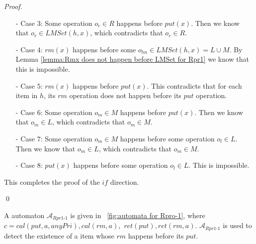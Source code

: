 \documentclass{llncs}
\begin{document}
\begin {proof}
\begin{itemize}
\item[-] Case $3$: Some operation $o_r \in R$ happens before $\textit{put}(x)$. Then we know that $o_r \in \textit{LMSet}(h,x)$, which contradicts that $o_r \in R$.

\item[-] Case $4$: $\textit{rm}(x)$ happens before some $o_{lm} \in \textit{LMSet}(h,x) = L \cup M$. By Lemma \ref{lemma:Rmx does not happen before LMSet for Rpr1} we know that this is impossible.

\item[-] Case $5$: $\textit{rm}(x)$ happens before $\textit{put}(x)$. This contradicts that for each item in $h$, its $\textit{rm}$ operation does not happen before its $\textit{put}$ operation.

\item[-] Case $6$: Some operation $o_m \in M$ happens before $\textit{put}(x)$. Then we know that $o_m \in L$, which contradicts that $o_m \in M$.

\item[-] Case $7$: Some operation $o_m \in M$ happens before some operation $o_l \in L$. Then we know that $o_m \in L$, which contradicts that $o_m \in M$.

\item[-] Case $8$: $\textit{put}(x)$ happens before some operation $o_l \in L$. This is impossible.
\end{itemize}

This completes the proof of the $\textit{if}$ direction.

\qed
\end {proof}



A automaton $\mathcal{A}_{\textit{Rpr1-1}}$ is given in \figurename~\ref{fig:automata for Rpro-1}, where $c=\textit{cal}(\textit{put},a,\textit{anyPri}),\textit{cal}(rm,a),$ $\textit{ret}(\textit{put}),\textit{ret}(\textit{rm},a)$. $\mathcal{A}_{\textit{Rpr1-1}}$ is used to detect the existence of a item whose $\textit{rm}$ happens before its $\textit{put}$.
\end{document}
